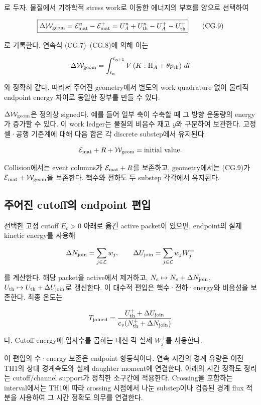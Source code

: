 \documentclass[11pt,a4paper]{article}
\begin{document}
로 두자. 물질에서 기하학적 stress work로 이동한 에너지의 부호를 양으로 선택하여

\[
\boxed{
\Delta\mathcal W_{\rm geom}
=\mathcal E_{\rm mat}^{n}-\mathcal E_{\rm mat}^{+}
=U_A^n+U_{\rm th}^n-U_A^+-U_{\rm th}^+
}
\tag{CG.9}
\]

로 기록한다. 연속식 (CG.7)--(CG.8)에 의해 이는

\[
\Delta\mathcal W_{\rm geom}
=\int_{t_n}^{t_{n+1}}
V\left(K:\Pi_A+\theta p_{\rm th}\right)\,dt
\]

와 정확히 같다. 따라서 주어진 geometry에서 별도의 work quadrature 없이 물리적 endpoint energy 차이로 동일한 장부를 만들 수 있다.

\(\Delta\mathcal W_{\rm geom}\)은 정의상 signed다. 예를 들어 일부 축이 수축할 때 그 방향 운동량의 energy가 증가할 수 있다. 이 work ledger는 물질의 비음수 재고 \(y\)와 구분하여 보관한다. 고정 셀·공행 기준계에 대해 다음 합은 각 discrete substep에서 유지된다.

\[
\mathcal E_{\rm mat}+R+\mathcal W_{\rm geom}=\text{initial value}.
\]

Collision에서는 event columns가 \(\mathcal E_{\rm mat}+R\)를 보존하고, geometry에서는 (CG.9)가 \(\mathcal E_{\rm mat}+\mathcal W_{\rm geom}\)을 보존한다. 핵수와 전하도 두 substep 각각에서 유지된다.

\hypertarget{uxc8fcuxc5b4uxc9c4-cutoffuxc758-endpoint-uxd3b8uxc785}{%
\subsection{주어진 cutoff의 endpoint 편입}\label{uxc8fcuxc5b4uxc9c4-cutoffuxc758-endpoint-uxd3b8uxc785}}

선택한 고정 cutoff \(E_c>0\) 아래로 옮긴 active packet이 있으면, endpoint의 실제 kinetic energy를 사용해

\[
\Delta N_{\rm join}=\sum_{j\in\mathcal L}w_j,\qquad
\Delta U_{\rm join}=\sum_{j\in\mathcal L}w_j W_j^+
\]

를 계산한다. 해당 packet을 active에서 제거하고, \(N_e\mapsto N_e+\Delta N_{\rm join}\), \(U_{\rm th}\mapsto U_{\rm th}+\Delta U_{\rm join}\)로 갱신한다. 이 대수적 편입은 핵수·전하·energy와 비음성을 보존한다. 최종 온도는

\[
T_{\rm joined}
=\frac{U_{\rm th}^{+}+\Delta U_{\rm join}}
{c_v(N_{\rm th}^{+}+\Delta N_{\rm join})}
\]

다. Cutoff energy에 입자수를 곱하는 대신 각 실제 \(W_j^+\)를 사용한다.

이 편입의 수·energy 보존은 endpoint 항등식이다. 연속 시간의 경계 유량은 이전 TH1의 상대 경계속도와 실제 daughter moment에 연결한다. 아래의 시간 정확도 정리는 cutoff/channel support가 정칙한 소구간에 적용한다. Crossing을 포함하는 interval에서는 TH1에 따라 crossing 시점에서 나눈 substep이나 검증된 경계 flux 적분을 사용하여 그 시간 정확도 의무를 연결한다.
\end{document}
